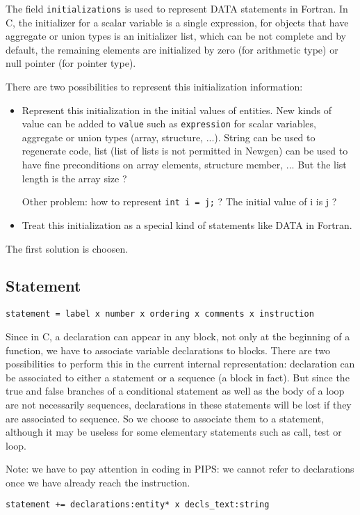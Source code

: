 \documentclass[a4paper]{article}
\begin{document}
The field \verb/initializations/ is used to represent DATA statements in
Fortran. 
In C, the initializer for a scalar variable is a single expression, for
objects that have aggregate or union types is an initializer list, which
can be not complete and by default, the remaining elements are initialized by zero (for
arithmetic type) or null pointer (for pointer type).

There are two possibilities to represent this initialization information:
\begin{itemize}
\item Represent this initialization in the initial values of
entities. New kinds of value can be added to \verb/value/ such as
\verb/expression/ for scalar variables, 
aggregate or union types (array, structure, ...). String can be used to
  regenerate code, list (list of lists is not permitted in Newgen) can be used  to
  have fine preconditions on array elements, structure member, ... But the
  list length is the array size ?

Other problem: how to represent \verb/int i = j;/ ? The initial value of i
is j ?
\item Treat this initialization as a special kind of statements like DATA
  in Fortran. 
\end{itemize}
The first solution is choosen. 
\subsection{Statement}
\label{statement}
 
\verb/statement = label x number x ordering x comments x instruction/

Since in C, a declaration can appear in any block, not only at the
beginning of a function, we have to associate variable declarations
to blocks. There are two possibilities to perform this in the current internal representation: declaration can be associated to
either a statement or a sequence (a block in fact). But since the true and false branches of a
conditional statement as well as the body of a loop are not necessarily
sequences, declarations in these statements will be lost if
they are associated to sequence. So we choose to associate them to
a statement, although it may be useless for some elementary statements such
as call, test or loop. 

Note: we have to pay attention in coding in
PIPS: we cannot refer to declarations once we have already reach the
instruction.   

\verb/statement += declarations:entity* x decls_text:string/
\end{document}
